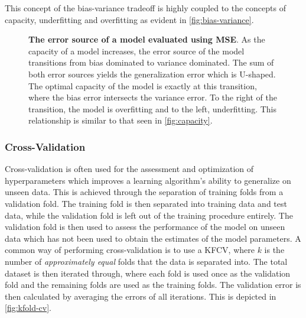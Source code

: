 This concept of the bias-variance tradeoff is highly coupled to the concepts of
capacity, underfitting and overfitting as evident in
\autoref{fig:bias-variance}.

\begin{figure}[htp!]
    \centering
    
    \captionsetup{format=hang} %
    \caption{
        \textbf{The error source of a model evaluated using \gls{MSE}}. As the
        capacity of a model increases, the error source of the model transitions
        from bias dominated to variance dominated. The sum of both error sources
        yields the generalization error which is U-shaped. The optimal capacity
        of the model is exactly at this transition, where the bias error
        intersects the variance error. To the right of the transition, the model
        is overfitting and to the left, underfitting. This relationship is
        similar to that seen in \autoref{fig:capacity}.
    }
    \label{fig:bias-variance}
\end{figure}



\subsubsection{Cross-Validation}
Cross-validation is often used for the assessment and optimization of
hyperparameters which improves a learning algorithm's ability to generalize on
unseen data. This is achieved through the separation of training folds from a
validation fold. The training fold is then separated into training data and
test data, while the validation fold is left out of the training procedure
entirely. The validation fold is then used to assess the performance of the
model on unseen data which has not been used to obtain the estimates of the
model parameters. A common way of performing cross-validation is to use a
\gls{KFCV}, where $k$ is the number of \textit{approximately
equal} folds that the data is separated into. The total dataset is then iterated
through, where each fold is used once as the validation fold and the remaining
folds are used as the training folds. The validation error is then calculated by
averaging the errors of all iterations. This is depicted in
\autoref{fig:kfold-cv}. \cite[p.~241-245]{hastie2009elements}


